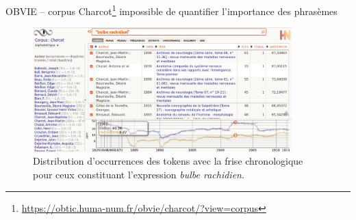 %
\begin{frame}{OBVIE -- corpus Charcot\footnote{\url{https://obtic.huma-num.fr/obvie/charcot/?view=corpus}}}
\danger{} impossible de quantifier l'importance des phrasèmes
\begin{figure}[!h]
    \centering
\includegraphics[width=100mm,scale=0.5]{pic/bulbe_rachidien.png}
    \caption{Distribution d'occurrences des tokens avec la frise chronologique pour ceux constituant l'expression \textit{bulbe rachidien}.}
    \label{fig:my_label}
\end{figure}
\end{frame}

